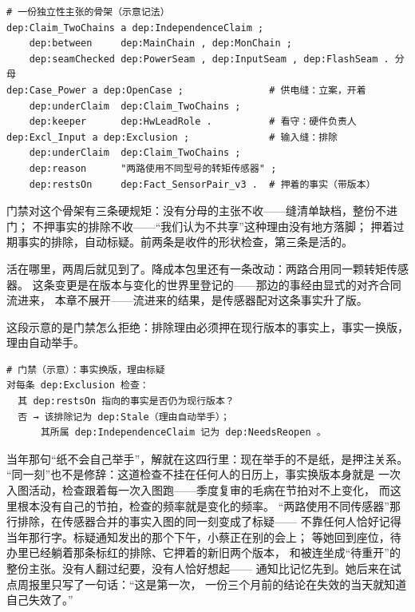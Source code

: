\nopagebreak[4]
\begin{codebox}
\begin{Verbatim}[fontsize=\small,breaklines=true,breakanywhere=true,breaksymbolleft={},breaksymbolright={}]
# 一份独立性主张的骨架（示意记法）
dep:Claim_TwoChains a dep:IndependenceClaim ;
    dep:between     dep:MainChain , dep:MonChain ;
    dep:seamChecked dep:PowerSeam , dep:InputSeam , dep:FlashSeam . 分母
dep:Case_Power a dep:OpenCase ;               # 供电缝：立案，开着
    dep:underClaim  dep:Claim_TwoChains ;
    dep:keeper      dep:HwLeadRole .          # 看守：硬件负责人
dep:Excl_Input a dep:Exclusion ;              # 输入缝：排除
    dep:underClaim  dep:Claim_TwoChains ;
    dep:reason      "两路使用不同型号的转矩传感器" ;
    dep:restsOn     dep:Fact_SensorPair_v3 .  # 押着的事实（带版本）
\end{Verbatim}
\end{codebox}

门禁对这个骨架有三条硬规矩：没有分母的主张不收——缝清单缺档，整份不进门；
不押事实的排除不收——“我们认为不共享”这种理由没有地方落脚；
押着过期事实的排除，自动标疑。前两条是收件的形状检查，第三条是活的。

活在哪里，两周后就见到了。降成本包里还有一条改动：两路合用同一颗转矩传感器。
这条变更是在版本与变化的世界里登记的——那边的事经由显式的对齐合同流进来，
本章不展开——流进来的结果，是传感器配对这条事实升了版。

这段示意的是门禁怎么拒绝：排除理由必须押在现行版本的事实上，事实一换版，
理由自动举手。

\nopagebreak[4]
\begin{codebox}
\begin{Verbatim}[fontsize=\small,breaklines=true,breakanywhere=true,breaksymbolleft={},breaksymbolright={}]
# 门禁（示意）：事实换版，理由标疑
对每条 dep:Exclusion 检查：
  其 dep:restsOn 指向的事实是否仍为现行版本？
  否 → 该排除记为 dep:Stale（理由自动举手）；
      其所属 dep:IndependenceClaim 记为 dep:NeedsReopen 。
\end{Verbatim}
\end{codebox}

当年那句“纸不会自己举手”，解就在这四行里：现在举手的不是纸，是押注关系。
“同一刻”也不是修辞：这道检查不挂在任何人的日历上，事实换版本身就是
一次入图活动，检查跟着每一次入图跑——季度复审的毛病在节拍对不上变化，
而这里根本没有自己的节拍，检查的频率就是变化的频率。
“两路使用不同传感器”那行排除，在传感器合并的事实入图的同一刻变成了标疑——
不靠任何人恰好记得当年那行字。标疑通知发出的那个下午，小蔡正在别的会上；
等她回到座位，待办里已经躺着那条标红的排除、它押着的新旧两个版本，
和被连坐成“待重开”的整份主张。没有人翻过纪要，没有人恰好想起——
通知比记忆先到。她后来在试点周报里只写了一句话：“这是第一次，
一份三个月前的结论在失效的当天就知道自己失效了。”

